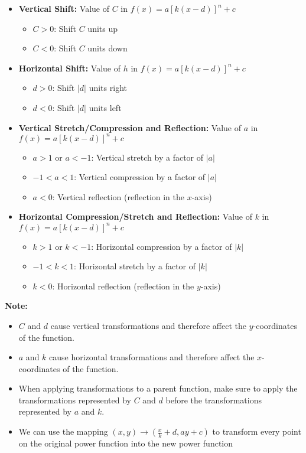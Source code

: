 \documentclass{article}
\begin{document}
\begin{itemize}
    \item \textbf{Vertical Shift:} Value of $C$ in $f(x) = a[k(x - d)]^n + c$
    \begin{itemize}
        \item $C > 0$: Shift $C$ units up
        \item $C < 0$: Shift $C$ units down
    \end{itemize}
    
    \item \textbf{Horizontal Shift:} Value of $h$ in $f(x) = a[k(x - d)]^n + c$
    \begin{itemize}
        \item $d > 0$: Shift $|d|$ units right
        \item $d < 0$: Shift $|d|$ units left
    \end{itemize}
    
    \item \textbf{Vertical Stretch/Compression and Reflection:} Value of $a$ in $f(x) = a[k(x - d)]^n + c$
    \begin{itemize}
        \item $a > 1$ or $a < -1$: Vertical stretch by a factor of $|a|$
        \item $-1 < a < 1$: Vertical compression by a factor of $|a|$
        \item $a < 0$: Vertical reflection (reflection in the $x$-axis)
    \end{itemize}
    
    \item \textbf{Horizontal Compression/Stretch and Reflection:} Value of $k$ in $f(x) = a[k(x - d)]^n + c$
    \begin{itemize}
        \item $k > 1$ or $k < -1$: Horizontal compression by a factor of $|k|$
        \item $-1 < k < 1$: Horizontal stretch by a factor of $|k|$
        \item $k < 0$: Horizontal reflection (reflection in the $y$-axis)
    \end{itemize}
\end{itemize}

\textbf{Note:}
\begin{itemize}
    \item $C$ and $d$ cause vertical transformations and therefore affect the $y$-coordinates of the function.
    \item $a$ and $k$ cause horizontal transformations and therefore affect the $x$-coordinates of the function.
    \item When applying transformations to a parent function, make sure to apply the transformations represented by $C$ and $d$ before the transformations represented by $a$ and $k$.
    \item We can use the mapping $(x,y) \to \left( \frac{x}{k}+d, ay+c\right)$ to transform every point on the original power function into the new power function
\end{itemize}
\end{document}

